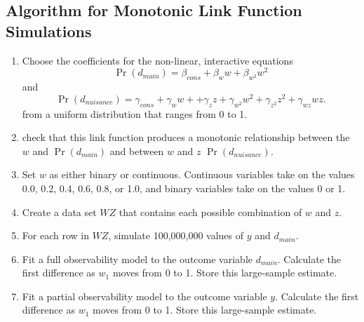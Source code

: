 \documentclass[10pt]{article}
\begin{document}
\begin{appendix}
\section{Algorithm for Monotonic Link Function Simulations}\label{app:mon}

\begin{enumerate}
\item Choose the coefficients for the non-linear, interactive equations
\begin{equation}
\Pr(d_{main}) = \beta_{cons} + \beta_w w + \beta_{w^2} w^2 \nonumber
\end{equation}
and 
\begin{equation}
\Pr(d_{nuisance}) = \gamma_{cons} + \gamma_w w + + \gamma_z z + \gamma_{w^2} w^2 + \gamma_{z^2} z^2 + \gamma_{wz} wz \text{.}\nonumber
\end{equation}
from a uniform distribution that ranges from 0 to 1.
\item check that this link function produces a monotonic relationship between the $w$ and $\Pr(d_{main})$ and between $w$ and $z$ $\Pr(d_{nuisance})$. 
\item Set $w$ as either binary or continuous. Continuous variables take on the values 0.0, 0.2, 0.4, 0.6, 0.8, or 1.0, and binary variables take on the values 0 or 1.
\item Create a data set $WZ$ that contains each possible combination of $w$ and $z$. 
\item For each row in $WZ$, simulate 100,000,000 values of $y$ and $d_{main}$.
\item Fit a full observability model to the outcome variable $d_{main}$. Calculate the first difference as $w_1$ moves from 0 to 1. Store this large-sample estimate.
\item Fit a partial observability model to the outcome variable $y$. Calculate the first difference as $w_1$ moves from 0 to 1. Store this large-sample estimate.
\end{enumerate}



\end{appendix}
\end{document}

